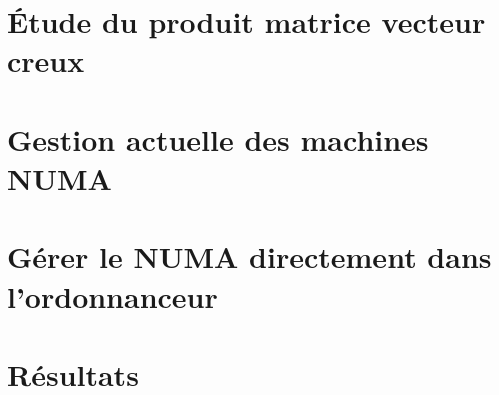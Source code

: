 \documentclass[twoside,11pt]{classes/Thesis}
\begin{document}
\section{\'Etude du produit matrice vecteur creux}




\section{Gestion actuelle des machines NUMA}









\section{Gérer le NUMA directement dans l'ordonnanceur}




\section{Résultats}







\end{document}
